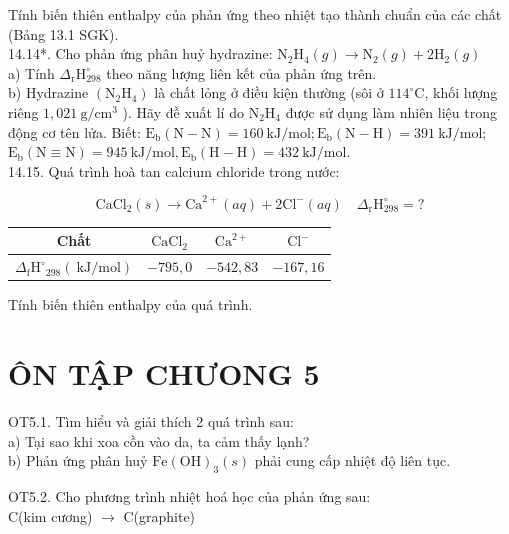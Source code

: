 \documentclass[10pt]{article}
\begin{document}
Tính biến thiên enthalpy của phản ứng theo nhiệt tạo thành chuẩn của các chất (Bảng 13.1 SGK).\\
14.14*. Cho phản ứng phân huỷ hydrazine: $\mathrm{N}_{2} \mathrm{H}_{4}(g) \rightarrow \mathrm{N}_{2}(g)+2 \mathrm{H}_{2}(g)$\\
a) Tính $\Delta_{\mathrm{r}} \mathrm{H}_{298}^{\circ}$ theo năng lượng liên kết của phản ứng trên.\\
b) Hydrazine $\left(\mathrm{N}_{2} \mathrm{H}_{4}\right)$ là chất lỏng ở điều kiện thường (sôi ở $114^{\circ} \mathrm{C}$, khối lượng riêng $1,021 \mathrm{~g} / \mathrm{cm}^{3}$ ). Hãy đề xuất lí do $\mathrm{N}_{2} \mathrm{H}_{4}$ được sử dụng làm nhiên liệu trong động cơ tên lửa. Biết: $\mathrm{E}_{\mathrm{b}}(\mathrm{N}-\mathrm{N})=160 \mathrm{~kJ} / \mathrm{mol} ; \mathrm{E}_{\mathrm{b}}(\mathrm{N}-\mathrm{H})=391 \mathrm{~kJ} / \mathrm{mol}$; $\mathrm{E}_{\mathrm{b}}(\mathrm{N} \equiv \mathrm{N})=945 \mathrm{~kJ} / \mathrm{mol}, \mathrm{E}_{\mathrm{b}}(\mathrm{H}-\mathrm{H})=432 \mathrm{~kJ} / \mathrm{mol}$.\\
14.15. Quá trình hoà tan calcium chloride trong nước:

$$
\mathrm{CaCl}_{2}(s) \rightarrow \mathrm{Ca}^{2+}(a q)+2 \mathrm{Cl}^{-}(a q) \quad \Delta_{\mathrm{r}} \mathrm{H}_{298}^{\circ}=?
$$

\begin{center}
\begin{tabular}{|c|c|c|c|}
\hline
Chất & $\mathrm{CaCl}_{2}$ & $\mathrm{Ca}^{2+}$ & $\mathrm{Cl}^{-}$ \\
\hline
$\Delta_{\mathrm{f}} \mathrm{H}^{\circ}{ }_{298}(\mathrm{~kJ} / \mathrm{mol})$ & $-795,0$ & $-542,83$ & $-167,16$ \\
\hline
\end{tabular}
\end{center}

Tính biến thiên enthalpy của quá trình.

\section*{ÔN TẬP CHƯONG 5}
OT5.1. Tìm hiểu và giải thích 2 quá trình sau:\\
a) Tại sao khi xoa cồn vào da, ta cảm thấy lạnh?\\
b) Phản ứng phân huỷ $\mathrm{Fe}(\mathrm{OH})_{3}(s)$ phải cung cấp nhiệt độ liên tục.

OT5.2. Cho phương trình nhiệt hoá học của phản ứng sau:\\
C(kim cương) $\longrightarrow$ C(graphite)
\end{document}
